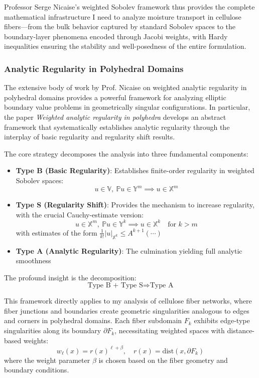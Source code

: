 \documentclass[11pt]{article}
\begin{document}
Professor Serge Nicaise's weighted Sobolev framework thus provides the complete mathematical infrastructure I need to analyze moisture transport in cellulose fibers—from the bulk behavior captured by standard Sobolev spaces to the boundary-layer phenomena encoded through Jacobi weights, with Hardy inequalities ensuring the stability and well-posedness of the entire formulation.

\subsubsection{Analytic Regularity in Polyhedral Domains}

The extensive body of work by Prof. Nicaise on weighted analytic regularity in polyhedral domains provides a powerful framework for analyzing elliptic boundary value problems in geometrically singular configurations. In particular, the paper \textit{Weighted analytic regularity in polyhedra} \cite{costabel2014weighted} develops an abstract framework that systematically establishes analytic regularity through the interplay of basic regularity and regularity shift results.

The core strategy decomposes the analysis into three fundamental components:

\begin{itemize}
    \item \textbf{Type B (Basic Regularity)}: Establishes finite-order regularity in weighted Sobolev spaces:
    \[
    u \in \mathbb{V},\ \mathbb{P}u \in \mathbb{Y}^m \implies u \in \mathbb{X}^m
    \]
    \item \textbf{Type S (Regularity Shift)}: Provides the mechanism to increase regularity, with the crucial Cauchy-estimate version:
    \[
    u \in \mathbb{X}^m,\ \mathbb{P}u \in \mathbb{Y}^k \implies u \in \mathbb{X}^k \quad \text{for } k > m
    \]
    with estimates of the form $\frac{1}{k!}|u|_{\mathbb{X}^k} \leq A^{k+1}(\cdots)$
    \item \textbf{Type A (Analytic Regularity)}: The culmination yielding full analytic smoothness
\end{itemize}

The profound insight is the decomposition:
\[
\text{Type B + Type S} \Rightarrow \text{Type A}
\]

This framework directly applies to my analysis of cellulose fiber networks, where fiber junctions and boundaries create geometric singularities analogous to edges and corners in polyhedral domains. Each fiber subdomain $F_k$ exhibits edge-type singularities along its boundary $\partial F_k$, necessitating weighted spaces with distance-based weights:
\[
w_\ell(x) = r(x)^{\ell + \beta}, \quad r(x) = \text{dist}(x, \partial F_k)
\]
where the weight parameter $\beta$ is chosen based on the fiber geometry and boundary conditions.
\end{document}
